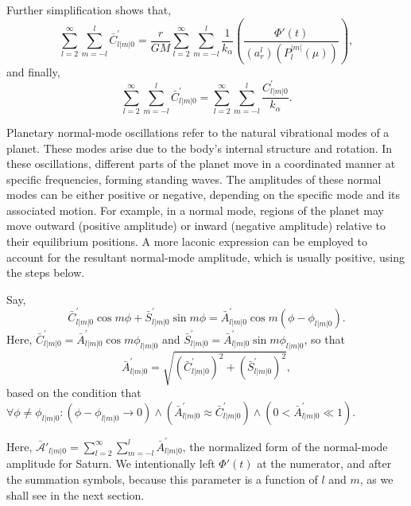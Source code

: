 \documentclass{article}
\begin{document}
Further simplification shows that,
\begin{equation}
\sum_{l=2}^{\infty}\sum_{m=-l}^{l}\bar{C}_{l|m|0}^{'} = \frac{r}{GM} \sum_{l=2}^{\infty}\sum_{m=-l}^{l}\frac{1}{k_{\alpha}} \left(\frac{\Phi{'}(t)}{(a_{r}^{l})(P_{l}^{|m|}(\mu))}\right),
\end{equation}
and finally,
\begin{equation}
\sum_{l=2}^{\infty}\sum_{m=-l}^{l}\bar{C}_{l|m|0}^{'} = \sum_{l=2}^{\infty}\sum_{m=-l}^{l}\frac{C_{l|m|0}^{'}}{k_{\alpha}}.
\end{equation}

Planetary normal-mode oscillations refer to the natural vibrational modes of a planet. These modes arise due to the body's internal structure and rotation. In these oscillations, different parts of the planet move in a coordinated manner at specific frequencies, forming standing waves. The amplitudes of these normal modes can be either positive or negative, depending on the specific mode and its associated motion. For example, in a normal mode, regions of the planet may move outward (positive amplitude) or inward (negative amplitude) relative to their equilibrium positions. A more laconic expression can be employed to account for the resultant normal-mode amplitude, which is usually positive, using the steps below\cite{Zharkov1985ThePO}.

Say, 
\begin{equation}
\bar{C}_{l|m|0}^{'}\cos m\phi + \bar{S}_{l|m|0}^{'}\sin m\phi = \bar{A}_{l|m|0}^{'}\cos m(\phi-\phi_{l|m|0}). 
\end{equation}
Here, $\bar{C}_{l|m|0}^{'} = \bar{A}_{l|m|0}^{'}\cos m\phi_{l|m|0}$ and $\bar{S}_{l|m|0}^{'} = \bar{A}_{l|m|0}^{'}\sin m\phi_{l|m|0}$, so that
\begin{equation}
\bar{A}_{l|m|0}^{'} = \sqrt{(\bar{C}_{l|m|0}^{'})^{2} + (\bar{S}_{l|m|0}^{'})^{2}},
\end{equation}
based on the condition that $\forall \phi \neq \phi_{l|m|0} : (\phi - \phi_{l|m|0} \rightarrow 0) \land (\bar{A}_{l|m|0}^{'} \approx \bar{C}_{l|m|0}^{'}) \land (0 < \bar{A}_{l|m|0}^{'} \ll 1)$.

Here, $\mathscr{\bar{A}'}_{l|m|0} = \sum_{l=2}^{\infty}\sum_{m=-l}^{l}\bar{A}_{l|m|0}^{'}$, the normalized form of the normal-mode amplitude for Saturn. We intentionally left $\Phi{'}(t)$ at the numerator, and after the summation symbols, because this parameter is a function of $l$ and $m$, as we shall see in the next section. 

\vspace{3pt}
\end{document}
